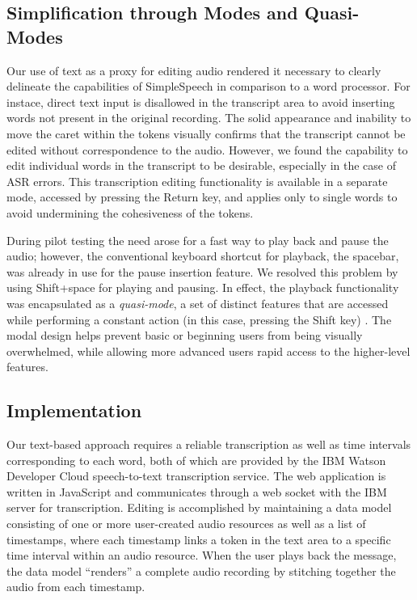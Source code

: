 \documentclass{sigchi}
\begin{document}
\subsection{Simplification through Modes and Quasi-Modes}
Our use of text as a proxy for editing audio rendered it necessary to clearly delineate the capabilities of SimpleSpeech in comparison to a word processor.
For instace, direct text input is disallowed in the transcript area to avoid inserting words not present in the original recording.
The solid appearance and inability to move the caret within the tokens visually confirms that the transcript cannot be edited without correspondence to the audio.
However, we found the capability to edit individual words in the transcript to be desirable, especially in the case of ASR errors.
This transcription editing functionality is available in a separate mode, accessed by pressing the Return key, and applies only to single words to avoid undermining the cohesiveness of the tokens. 

During pilot testing the need arose for a fast way to play back and pause the audio; however, the conventional keyboard shortcut for playback, the spacebar, was already in use for the pause insertion feature.
We resolved this problem by using Shift+space for playing and pausing.
In effect, the playback functionality was encapsulated as a \emph{quasi-mode}, a set of distinct features that are accessed while performing a constant action (in this case, pressing the Shift key) \cite{raskin}. 
The modal design helps prevent basic or beginning users from being visually overwhelmed, while allowing more advanced users rapid access to the higher-level features.

\subsection{Implementation}
Our text-based approach requires a reliable transcription as well as time intervals corresponding to each word, both of which are provided by the IBM Watson Developer Cloud speech-to-text transcription service.
The web application is written in JavaScript and communicates through a web socket with the IBM server for transcription.
Editing is accomplished by maintaining a data model consisting of one or more user-created audio resources as well as a list of timestamps, where each timestamp links a token in the text area to a specific time interval within an audio resource. 
When the user plays back the message, the data model ``renders'' a complete audio recording by stitching together the audio from each timestamp. 
\end{document}
